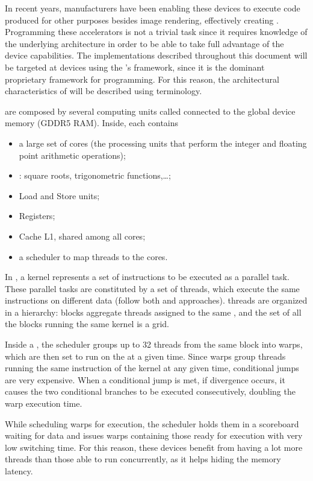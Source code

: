 In recent years, manufacturers have been enabling these devices to execute code produced for other purposes besides image rendering, effectively creating \gpgpus. Programming these accelerators is not a trivial task since it requires knowledge of the underlying architecture in order to be able to take full advantage of the device capabilities. The \gpu implementations described throughout this document will be targeted at \nvidia devices using the \nvidia's \cuda framework, since it is the dominant proprietary framework for \gpgpu programming. For this reason, the architectural characteristics of \gpgpus will be described using \cuda terminology.


\gpus are composed by several computing units called \sms connected to the global device memory (GDDR5 RAM). Inside, each \sm contains
\begin{itemize}
\item a large set of \cuda cores (the processing units that perform the integer and floating point arithmetic operations);
\item \sfus: square roots, trigonometric functions,\ldots;
\item Load and Store units;
\item Registers;
\item Cache L1, shared among all cores;
\item a scheduler to map threads to the cores.
\end{itemize}

In \cuda, a kernel represents a set of instructions to be executed as a parallel task. These parallel tasks are constituted by a set of \cuda threads, which execute the same instructions on different data (follow both \simd and \simt approaches). \cuda threads are organized in a hierarchy: blocks aggregate threads assigned to the same \sm, and the set of all the blocks running the same kernel is a grid.

Inside a \sm, the scheduler groups up to 32 threads from the same block into warps, which are then set to run on the \sm at a given time. Since warps group threads running the same instruction of the kernel at any given time, conditional jumps are very expensive. When a conditional jump is met, if divergence occurs, it causes the two conditional branches to be executed consecutively, doubling the warp execution time.

While scheduling warps for execution, the scheduler holds them in a scoreboard waiting for data and issues warps containing those ready for execution with very low switching time. For this reason, these devices benefit from having a lot more threads than those able to run concurrently, as it helps hiding the memory latency.

